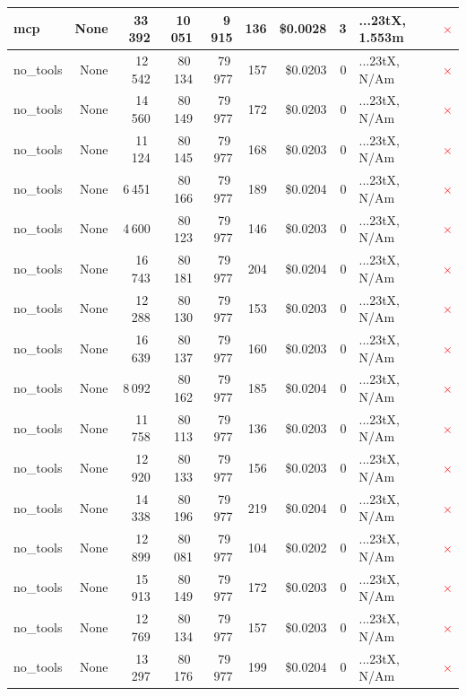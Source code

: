 \documentclass[a4paper,11pt]{article}
\begin{document}
\begin{table}[H]
{\begin{tabular}{l r r r r r r r l c}
mcp & None & 33\,392 & 10\,051 & 9\,915 & 136 & \$0.0028 & 3 & ...23tX, 1.553m & \textcolor{red}{\(\times\)} \\
\midrule
no\_tools & None & 12\,542 & 80\,134 & 79\,977 & 157 & \$0.0203 & 0 & ...23tX, N/Am & \textcolor{red}{\(\times\)} \\
no\_tools & None & 14\,560 & 80\,149 & 79\,977 & 172 & \$0.0203 & 0 & ...23tX, N/Am & \textcolor{red}{\(\times\)} \\
no\_tools & None & 11\,124 & 80\,145 & 79\,977 & 168 & \$0.0203 & 0 & ...23tX, N/Am & \textcolor{red}{\(\times\)} \\
no\_tools & None & 6\,451 & 80\,166 & 79\,977 & 189 & \$0.0204 & 0 & ...23tX, N/Am & \textcolor{red}{\(\times\)} \\
no\_tools & None & 4\,600 & 80\,123 & 79\,977 & 146 & \$0.0203 & 0 & ...23tX, N/Am & \textcolor{red}{\(\times\)} \\
no\_tools & None & 16\,743 & 80\,181 & 79\,977 & 204 & \$0.0204 & 0 & ...23tX, N/Am & \textcolor{red}{\(\times\)} \\
no\_tools & None & 12\,288 & 80\,130 & 79\,977 & 153 & \$0.0203 & 0 & ...23tX, N/Am & \textcolor{red}{\(\times\)} \\
no\_tools & None & 16\,639 & 80\,137 & 79\,977 & 160 & \$0.0203 & 0 & ...23tX, N/Am & \textcolor{red}{\(\times\)} \\
no\_tools & None & 8\,092 & 80\,162 & 79\,977 & 185 & \$0.0204 & 0 & ...23tX, N/Am & \textcolor{red}{\(\times\)} \\
no\_tools & None & 11\,758 & 80\,113 & 79\,977 & 136 & \$0.0203 & 0 & ...23tX, N/Am & \textcolor{red}{\(\times\)} \\
no\_tools & None & 12\,920 & 80\,133 & 79\,977 & 156 & \$0.0203 & 0 & ...23tX, N/Am & \textcolor{red}{\(\times\)} \\
no\_tools & None & 14\,338 & 80\,196 & 79\,977 & 219 & \$0.0204 & 0 & ...23tX, N/Am & \textcolor{red}{\(\times\)} \\
no\_tools & None & 12\,899 & 80\,081 & 79\,977 & 104 & \$0.0202 & 0 & ...23tX, N/Am & \textcolor{red}{\(\times\)} \\
no\_tools & None & 15\,913 & 80\,149 & 79\,977 & 172 & \$0.0203 & 0 & ...23tX, N/Am & \textcolor{red}{\(\times\)} \\
no\_tools & None & 12\,769 & 80\,134 & 79\,977 & 157 & \$0.0203 & 0 & ...23tX, N/Am & \textcolor{red}{\(\times\)} \\
no\_tools & None & 13\,297 & 80\,176 & 79\,977 & 199 & \$0.0204 & 0 & ...23tX, N/Am & \textcolor{red}{\(\times\)} \\

\end{tabular}}
\end{table}
\end{document}
